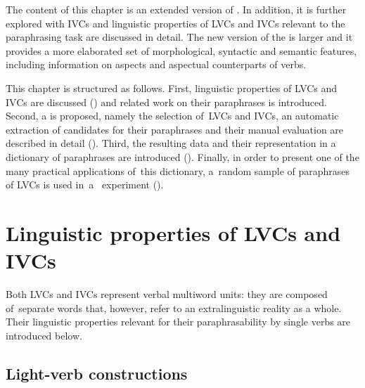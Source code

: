 \documentclass[output=paper,modfonts,nonflat]{langsci/langscibook}
\begin{document}
The content of this chapter is an extended version of \citet{barancikova2017paradi}.
In addition, it is further explored with IVCs and linguistic properties of LVCs and IVCs
relevant to the paraphrasing task are discussed in detail. The 
new version of the  is larger and it provides a more 
elaborated set of morphological, syntactic and semantic features, including 
information on aspects and aspectual counterparts of verbs.

This chapter is structured as follows. First, linguistic properties of LVCs and 
IVCs are discussed () and related work on their paraphrases is 
introduced. Second, a  is proposed, namely the 
selection of~LVCs and IVCs, an automatic extraction of candidates for their 
paraphrases and their manual evaluation are described in detail (). 
Third, the resulting data and their representation in a dictionary of 
paraphrases are introduced (). Finally, in order to present one 
of the many practical applications of~this dictionary, a~random sample of 
paraphrases of LVCs is used in~a~ experiment (). 

\section{Linguistic properties of LVCs and IVCs}
\label{liguistic}
Both LVCs and IVCs represent verbal multiword units: they are composed 
of~separate words that, however, refer to an extralinguistic reality as a whole. 
Their linguistic properties relevant for their paraphrasability by single verbs 
are introduced below. 

\subsection{Light-verb constructions}
\label{LVCs}
\end{document}
